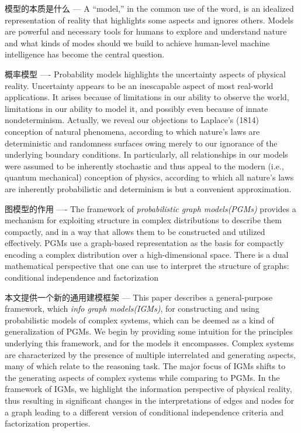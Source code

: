 \documentclass{article}
\theoremstyle{definition}
\theoremstyle{remark}
\theoremstyle{definition}
\begin{document}
\begin{CJK*}{UTF8}{gbsn}
模型的本质是什么 ---
A “model,” in the common use of the word, is an idealized representation of reality that highlights some aspects and ignores others\cite{Pearl2009}.
Models are powerful and necessary tools for humans to explore and understand nature and what kinds of modes should we build to achieve human-level machine intelligence has become the central question.

概率模型 ----
Probability models highlights the uncertainty aspects of physical reality. Uncertainty appears to be an inescapable aspect of most real-world applications. It arises because of limitations in our ability to observe the world, limitations in our ability to model it, and possibly even because of innate nondeterminism. Actually, we reveal our objections to Laplace’s (1814) conception of natural phenomena, according to which nature’s laws are deterministic and randomness surfaces owing merely to our ignorance of the underlying boundary conditions. In particularly, all relationships in our models were assumed to be inherently stochastic and thus appeal to the modern (i.e., quantum mechanical) conception of physics, according to which all nature’s laws are inherently probabilistic and determinism is but a convenient approximation.

图模型的作用 ----
The framework of \emph{probabilistic graph models(PGMs)} provides a mechanism for exploiting structure in complex distributions to describe them compactly, and in a way that allows them to be constructed and utilized effectively. PGMs use a graph-based representation as the basis for compactly encoding a complex distribution over a high-dimensional space. There is a dual mathematical perspective that one can use to interpret the structure of graphs: conditional independence and factorization\cite{koller2009probabilistic}

本文提供一个新的通用建模框架 ---
This paper describes a general-purpose framework, which \emph{info graph models(IGMs)}, for constructing and using probabilistic models of complex systems, which can be deemed as a kind of generalization of PGMs. We begin by providing some intuition for the principles underlying this framework, and for the models it encompasses. Complex systems are characterized by the presence of multiple interrelated and generating aspects, many of which relate to the reasoning task. The major focus of IGMs shifts to the generating aspects of complex systems while comparing to PGMs. In the framework of IGMs, we highlight the information perspective of physical reality, thus resulting in significant changes in the interpretations of edges and nodes for a graph leading to a different version of conditional independence criteria and factorization properties.


\end{CJK*}
\end{document}
